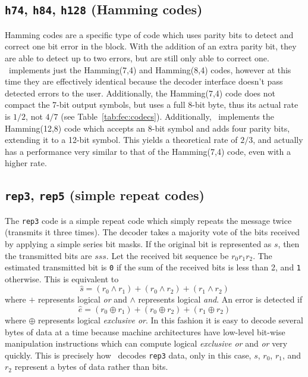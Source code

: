 \subsection{{\tt h74}, {\tt h84}, {\tt h128} (Hamming codes)}
\label{module:fec:hamming}
Hamming codes are a specific type of
code which uses parity bits to detect and correct one bit error in the block.
With the addition of an extra parity bit, they are able to detect up to two
errors, but are still only able to correct one.
\liquid\ implements just the Hamming(7,4) and Hamming(8,4) codes, however at
this time they are effectively identical because the decoder interface
doesn't pass detected errors to the user.
Additionally, the Hamming(7,4) code does not compact the 7-bit output symbols,
but uses a full 8-bit byte, thus its actual rate is $1/2$, not $4/7$ (see
Table~\ref{tab:fec:codecs}).
Additionally, \liquid\ implements the Hamming(12,8) code which accepts an
8-bit symbol and adds four parity bits, extending it to a 12-bit symbol.
This yields a theoretical rate of $2/3$, and actually has a performance very
similar to that of the Hamming(7,4) code, even with a higher rate.

\subsection{{\tt rep3}, {\tt rep5} (simple repeat codes)}
\label{module:fec:rep}
The {\tt rep3} code is a simple repeat code which simply repeats the message
twice (transmits it three times).
The decoder takes a majority vote of the bits received by applying a simple
series bit masks.
If the original bit is represented as $s$, then the transmitted bits are
$s s s$.
Let the received bit sequence be $r_0 r_1 r_2$.
The estimated transmitted bit is {\tt 0} if the sum of the received bits is
less than 2, and {\tt 1} otherwise.
This is equivalent to
\[
    \hat{s} =   (r_0 \land r_1) + 
                (r_0 \land r_2) + 
                (r_1 \land r_2) 
\]
where $+$ represents logical {\it or} and $\land$ represents
logical {\it and}.
An error is detected if
\[
    \hat{e} =   (r_0 \oplus r_1) + 
                (r_0 \oplus r_2) + 
                (r_1 \oplus r_2) 
\]
where $\oplus$ represents logical {\it exclusive or}.
In this fashion it is easy to decode several bytes of data at a time because
machine architectures have low-level bit-wise manipulation instructions which
can compute logical {\it exclusive or} and {\it or} very quickly.
This is precisely how \liquid\ decodes {\tt rep3} data, only in this case,
$s$, $r_0$, $r_1$, and $r_2$ represent a bytes of data rather than bits.

